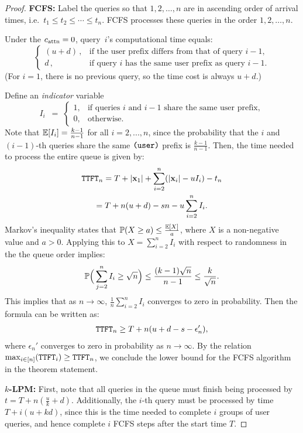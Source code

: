 \begin{proof}
\textbf{FCFS: } Label the queries so that $1,2,\dots,n$ are in ascending order of arrival times, i.e.\ $t_1\le t_2\le \cdots \le t_n$. FCFS processes these queries in the order $1,2,\dots,n$.

Under the $c_{\mathrm{attn}}=0$, query~$i$'s computational time equals:
\small{
\[
\begin{cases}
(u + d)\,, 
&\text{if the user prefix differs from that of query $i-1$,}\\[6pt]
d\,, 
&\text{if query $i$ has the same user prefix as query $i-1$.}
\end{cases}
\]
}
(For $i=1$, there is no previous query, so the time cost is always $u + d$.)

\smallskip

Define an \emph{indicator} variable 
\[
I_i 
~\;=\;
\begin{cases}
1, & \text{if queries $i$ and $i-1$ share the same user prefix},\\
0, & \text{otherwise}.
\end{cases}
\]
Note that $\mathbb{E}[I_i] = \frac{k-1}{n-1}$ for all $i=2,...,n$, since the probability that the $i$ and $(i-1)$-th queries share the same $\texttt{(user)}$ prefix is $\frac{k-1}{n-1}$. Then, the time needed to process the entire queue is given by:
\begin{gather*}
    \texttt{TTFT}_{n}
    = T + |\mathbf{x}_{1}| + \sum_{i=2}^n  (|\mathbf{x}_{i}| - uI_i) - t_n \\
    = T + n(u + d) - sn - u\sum_{i=2}^n  I_i.
\end{gather*}
Markov's inequality states that $\mathbb{P}(X \geq a) \leq \frac{\mathbb{E}[X]}{a}$, where $X$ is a non-negative value and $a > 0$.  Applying this to $X = \sum_{i=2}^n  I_i$ with respect to randomness in the the queue order implies:
\begin{gather*}
    \mathbb{P}\Big(\sum_{j=2}^n I_i \geq \sqrt{n}\Big) \leq \frac{(k-1)\sqrt{n}}{n-1}
    \leq 
    \frac{k}{\sqrt{n}}.
\end{gather*}
This implies that as $n \rightarrow \infty$, $\frac{1}{n}\sum_{i=2}^n I_i$ converges to zero in probability. Then the formula can be written as:
\begin{gather*}
    \texttt{TTFT}_n \geq T + n(u + d - s - \epsilon_n'),
\end{gather*}
where $\epsilon_n'$ converges to zero in probability as $n \rightarrow \infty$. By the relation $\max_{i\in[n]}(\texttt{TTFT}_i) \geq \texttt{TTFT}_n$, we conclude the lower bound for the FCFS algorithm in the theorem statement.

\textbf{$k$-LPM:} First, note that all queries in the queue must finish being processed by $t = T + n(\frac{u}{k} + d)$. Additionally, the $i$-th query must be 
processed by time $T + i(u + kd)$, since this is the time needed to complete $i$ groups of user queries, and hence complete $i$ FCFS steps after the start time $T$.


\end{proof}
